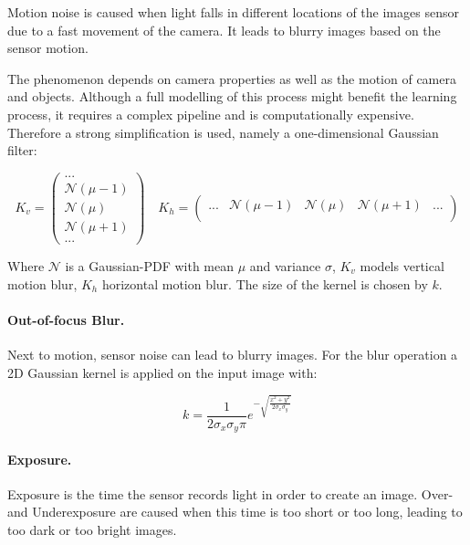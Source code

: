 Motion noise is caused when light falls in different locations of the images sensor due to a fast movement of the camera. It leads to blurry images based on the sensor motion.

The phenomenon depends on camera properties as well as the motion of camera and objects. Although a full modelling of this process might benefit the learning process, it requires a complex pipeline and is computationally expensive. Therefore a strong simplification is used, namely a one-dimensional Gaussian filter:

\begin{equation}
K_v = \begin{pmatrix}
...				 \\
\mathcal{N}(\mu-1) \\
\mathcal{N}(\mu)  \\
\mathcal{N}(\mu+1)	 \\
	...					
\end{pmatrix} \quad
K_h = \begin{pmatrix}
...	& \mathcal{N}(\mu-1)	&	\mathcal{N}(\mu) &	\mathcal{N}(\mu+1) & ...\\
\end{pmatrix}
	\label{eq:motion_noise}
\end{equation}

Where $\mathcal{N}$ is a Gaussian-PDF with mean $\mu$ and variance $\sigma$,  $K_v$ models vertical motion blur, $K_h$ horizontal motion blur. The size of the kernel is chosen by $k$.

\paragraph{Out-of-focus Blur.}

Next to motion, sensor noise can lead to blurry images. For the blur operation a 2D Gaussian kernel is applied on the input image with:

\begin{equation}
 k = \frac{1}{2\sigma_x\sigma_y\pi}e^{-\sqrt{\frac{x^2 + y^2}{2\sigma_x\sigma_y}}} 
\end{equation}

\paragraph{Exposure.}

Exposure is the time the sensor records light in order to create an image. Over- and Underexposure are caused when this time is too short or too long, leading to too dark or too bright images.

